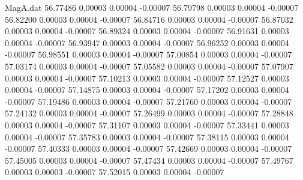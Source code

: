 \begin{filecontents}{MagA.dat}
  56.77486    0.00003    0.00004   -0.00007
  56.79798    0.00003    0.00004   -0.00007
  56.82200    0.00003    0.00004   -0.00007
  56.84716    0.00003    0.00004   -0.00007
  56.87032    0.00003    0.00004   -0.00007
  56.89324    0.00003    0.00004   -0.00007
  56.91631    0.00003    0.00004   -0.00007
  56.93947    0.00003    0.00004   -0.00007
  56.96252    0.00003    0.00004   -0.00007
  56.98551    0.00003    0.00004   -0.00007
  57.00854    0.00003    0.00004   -0.00007
  57.03174    0.00003    0.00004   -0.00007
  57.05582    0.00003    0.00004   -0.00007
  57.07907    0.00003    0.00004   -0.00007
  57.10213    0.00003    0.00004   -0.00007
  57.12527    0.00003    0.00004   -0.00007
  57.14875    0.00003    0.00004   -0.00007
  57.17202    0.00003    0.00004   -0.00007
  57.19486    0.00003    0.00004   -0.00007
  57.21760    0.00003    0.00004   -0.00007
  57.24132    0.00003    0.00004   -0.00007
  57.26499    0.00003    0.00004   -0.00007
  57.28848    0.00003    0.00004   -0.00007
  57.31107    0.00003    0.00004   -0.00007
  57.33441    0.00003    0.00004   -0.00007
  57.35783    0.00003    0.00004   -0.00007
  57.38115    0.00003    0.00004   -0.00007
  57.40333    0.00003    0.00004   -0.00007
  57.42669    0.00003    0.00004   -0.00007
  57.45005    0.00003    0.00004   -0.00007
  57.47434    0.00003    0.00004   -0.00007
  57.49767    0.00003    0.00003   -0.00007
  57.52015    0.00003    0.00004   -0.00007
\end{filecontents}

